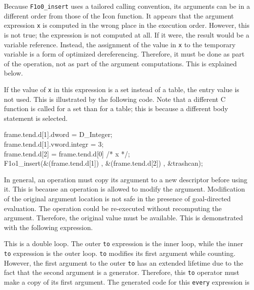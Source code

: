 \noindent
Because \texttt{F1o0\_insert} uses a tailored calling convention, its arguments
can be in a different order from those of the Icon function. It
appears that the argument expression \texttt{x} is computed in the wrong place
in the execution order.  However, this is not true; the expression is
not computed at all. If it were, the result would be a variable
reference.  Instead, the assignment of the value in \texttt{x} to the temporary
variable is a form of optimized dereferencing. Therefore, it must be
done as part of the operation, not as part of the argument
computations. This is explained below.

If the value of \texttt{x} in this expression is a set instead of a table, the
entry value is not used. This is illustrated by the following
code. Note that a different C function is called for a set than for a
table; this is because a different body statement is selected.

\goodbreak
\begin{iconcode}
\>frame.tend.d[1].dword = D\_Integer;\\
\>frame.tend.d[1].vword.integr = 3;\\
\>frame.tend.d[2] = frame.tend.d[0] /* x */;\\
\>F1o1\_insert(\&(frame.tend.d[1]) , \&(frame.tend.d[2]) , \&trashcan);\\
\end{iconcode}

In general, an operation must copy its argument to a new descriptor
before using it. This is because an operation is allowed to modify the
argument. Modification of the original argument location is not safe
in the presence of goal-directed evaluation. The operation could be
re-executed without recomputing the argument. Therefore, the original
value must be available. This is demonstrated with the following
expression.


\noindent
This is a double loop. The outer \texttt{to} expression is the inner
loop, while the inner \texttt{to} expression is the outer loop.
\texttt{to} modifies its first argument while counting. However,
the first argument to the outer \texttt{to} has an extended lifetime
due to the fact that the second argument is a generator. Therefore,
this \texttt{to} operator must make a copy of its first argument.  The
generated code for this \texttt{every} expression is

